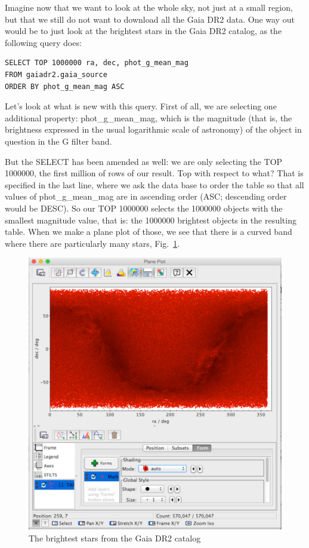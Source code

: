 \documentclass[twocolumn,apj]{openjournal}
\begin{document}
Imagine now that we want to look at the whole sky, not just at a small region, but that we still do not want to download all the Gaia DR2 data. One way out would be to just look at the brightest stars in the Gaia DR2 catalog, as the following query does:
\begin{lstlisting}
SELECT TOP 1000000 ra, dec, phot_g_mean_mag
FROM gaiadr2.gaia_source
ORDER BY phot_g_mean_mag ASC
\end{lstlisting}
Let's look at what is new with this query. First of all, we are selecting one additional property: phot\_g\_mean\_mag, which is the magnitude (that is, the brightness expressed in the usual logarithmic scale of astronomy) of the object in question in the G filter band. 

But the SELECT has been amended as well: we are only selecting the TOP 1000000, the first million of rows of our result. Top with respect to what? That is specified in the last line, where we ask the data base to order the table so that all values of phot\_g\_mean\_mag are in ascending order (ASC; descending order would be DESC). So our TOP 1000000 selects the 1000000 objects with the smallest magnitude value, that is: the 1000000 brightest objects in the resulting table.  When we make a plane plot of those, we see that there is a curved band where there are particularly many stars, Fig.~\ref{MilkyWayPlot}.
\begin{figure}[htbp]
\begin{center}
\includegraphics[width=\linewidth]{milky-way-plot.jpg}
\caption{The brightest stars from the Gaia DR2 catalog}
\label{MilkyWayPlot}
\end{center}
\end{figure}
\end{document}
